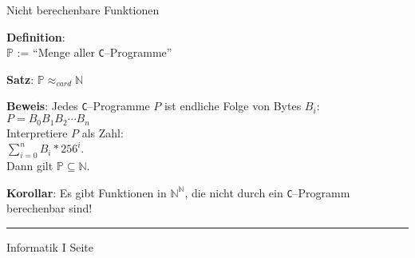 \begin{slide}{}
\normalsize
\begin{center}
  Nicht berechenbare Funktionen  
\end{center}


\textbf{Definition}: \\[0.3cm]
\hspace*{1.3cm} $\mathbb{P}$ \quad := \quad ``Menge aller \texttt{C}--Programme''

\footnotesize
\textbf{Satz}: \quad $\mathbb{P} \approx_{card} \mathbb{N}$

\textbf{Beweis}: Jedes \texttt{C}--Programme $P$ ist endliche Folge von Bytes $B_i$: \\[0.3cm]
\hspace*{1.3cm} $P = B_0 B_1 B_2 \cdots B_n$ \\[0.3cm]
Interpretiere $P$ als Zahl: \\[0.3cm]
\hspace*{1.3cm} $\sum\limits_{i=0}^n B_i * 256^i$. \\[0.3cm]
Dann gilt $\mathbb{P} \subseteq \mathbb{N}$.

\textbf{Korollar}: Es gibt Funktionen in $\mathbb{N}^\mathbb{N}$, die nicht durch ein
\texttt{C}--Programm berechenbar sind!

\vspace*{\fill}
\tiny \addtocounter{mypage}{1}
\rule{15cm}{1mm}
Informatik I  \hspace*{\fill} Seite 
\end{slide}



